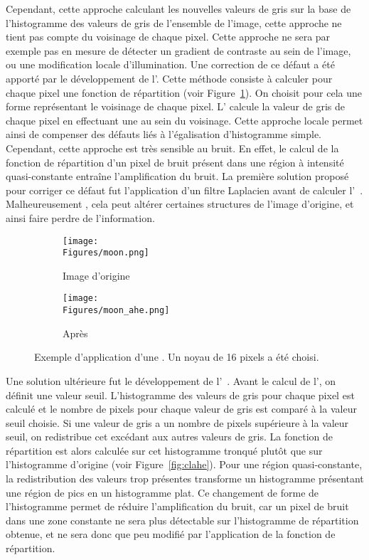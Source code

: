 \documentclass[\main/main.tex]{subfiles}
\begin{document}
%
Cependant, cette approche calculant les nouvelles valeurs de gris sur la base de l'histogramme des valeurs de gris de l'ensemble de l'image, cette approche ne tient pas compte du voisinage de chaque pixel. Cette approche ne sera par exemple pas en mesure de détecter un gradient de contraste au sein de l'image, ou une modification locale d'illumination.
%
Une correction de ce défaut a été apporté par le développement de l'\ahe{}\cite{hummel_1977}. Cette méthode consiste à calculer pour chaque pixel une fonction de répartition (voir Figure~\ref{fig:ahe}).
%
On choisit pour cela une forme représentant le voisinage de chaque pixel. L'\ahe{} calcule  la valeur de gris de chaque pixel en effectuant une \he{} au sein du voisinage. Cette approche locale permet ainsi de compenser des défauts liés à l'égalisation d'histogramme simple.
Cependant, cette approche est très sensible au bruit. En effet, le calcul de la fonction de répartition d'un pixel de bruit présent dans une région à intensité quasi-constante entraîne l'amplification du bruit.
%
La première solution proposé pour corriger ce défaut fut l'application d'un filtre Laplacien avant de calculer l'\ahe{}~\cite{hummel_1977}. Malheureusement , cela peut altérer certaines structures de l'image d'origine, et ainsi faire perdre de l'information.

\begin{figure}[h]
    \centering
    \begin{subfigure}[b]{0.45\textwidth}
       \caption{
       Image d'origine
            }
       \centering \texttt{[image: \\Figures/moon.png]}
    \end{subfigure}
    \begin{subfigure}[b]{0.45\textwidth}
       \caption{
       Après \ahe{}
            }
       \centering \texttt{[image: \\Figures/moon\_ahe.png]}
    \end{subfigure}
    \caption{
        \label{fig:ahe}
        Exemple d'application d'une \ahe{}. Un noyau de 16 pixels a été choisi.
    }
\end{figure}
%
Une solution ultérieure fut le développement de l'\clahe{}~\cite{pizer_1987}. Avant le calcul de l'\clahe{}, on définit une valeur seuil. L'histogramme des valeurs de gris pour chaque pixel est calculé et le nombre de pixels pour chaque valeur de gris est comparé à la valeur seuil choisie. Si une valeur de gris a un nombre de pixels supérieure à la valeur seuil, on redistribue cet excédant aux autres valeurs de gris. La fonction de répartition est alors calculée sur cet histogramme tronqué plutôt que sur l'histogramme d'origine (voir Figure~\ref{fig:clahe}).
%
Pour une région quasi-constante, la redistribution des valeurs trop présentes transforme un histogramme présentant une région de pics en un histogramme plat. Ce changement de forme de l'histogramme permet de réduire l'amplification du bruit, car un pixel de bruit dans une zone constante ne sera plus détectable sur l'histogramme de répartition obtenue, et ne sera donc que peu modifié par l'application de la fonction de répartition.
\end{document}
